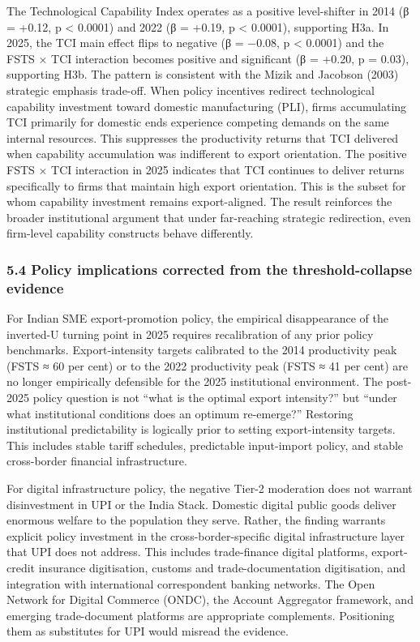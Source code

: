 \documentclass[
  12pt,a4paper]{article}
\begin{document}
The Technological Capability Index operates as a positive level-shifter
in 2014 (β = +0.12, p \textless{} 0.0001) and 2022 (β = +0.19, p
\textless{} 0.0001), supporting H3a. In 2025, the TCI main effect flips
to negative (β = −0.08, p \textless{} 0.0001) and the FSTS × TCI
interaction becomes positive and significant (β = +0.20, p = 0.03),
supporting H3b. The pattern is consistent with the Mizik and Jacobson
(2003) strategic emphasis trade-off. When policy incentives redirect
technological capability investment toward domestic manufacturing (PLI),
firms accumulating TCI primarily for domestic ends experience competing
demands on the same internal resources. This suppresses the productivity
returns that TCI delivered when capability accumulation was indifferent
to export orientation. The positive FSTS × TCI interaction in 2025
indicates that TCI continues to deliver returns specifically to firms
that maintain high export orientation. This is the subset for whom
capability investment remains export-aligned. The result reinforces the
broader institutional argument that under far-reaching strategic
redirection, even firm-level capability constructs behave differently.

\hypertarget{policy-implications-corrected-from-the-threshold-collapse-evidence}{%
\subsubsection{5.4 Policy implications corrected from the
threshold-collapse
evidence}\label{policy-implications-corrected-from-the-threshold-collapse-evidence}}

For Indian SME export-promotion policy, the empirical disappearance of
the inverted-U turning point in 2025 requires recalibration of any prior
policy benchmarks. Export-intensity targets calibrated to the 2014
productivity peak (FSTS ≈ 60 per cent) or to the 2022 productivity peak
(FSTS ≈ 41 per cent) are no longer empirically defensible for the 2025
institutional environment. The post-2025 policy question is not ``what
is the optimal export intensity?'' but ``under what institutional
conditions does an optimum re-emerge?'' Restoring institutional
predictability is logically prior to setting export-intensity targets.
This includes stable tariff schedules, predictable input-import policy,
and stable cross-border financial infrastructure.

For digital infrastructure policy, the negative Tier-2 moderation does
not warrant disinvestment in UPI or the India Stack. Domestic digital
public goods deliver enormous welfare to the population they serve.
Rather, the finding warrants explicit policy investment in the
cross-border-specific digital infrastructure layer that UPI does not
address. This includes trade-finance digital platforms, export-credit
insurance digitisation, customs and trade-documentation digitisation,
and integration with international correspondent banking networks. The
Open Network for Digital Commerce (ONDC), the Account Aggregator
framework, and emerging trade-document platforms are appropriate
complements. Positioning them as substitutes for UPI would misread the
evidence.
\end{document}
